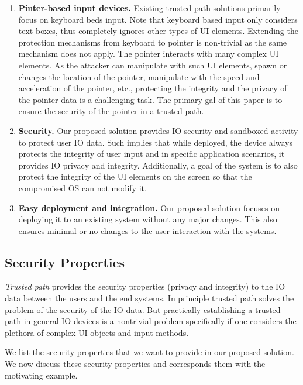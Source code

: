 \begin{enumerate}[leftmargin=*]
  \item  \textbf{Pinter-based input devices.} Existing trusted path solutions primarily focus on keyboard beds input. Note that keyboard based input only considers text boxes, thus completely ignores other types of UI elements. Extending the protection mechanisms from keyboard to pointer is non-trivial as the same mechanism does not apply. The pointer interacts with many complex UI elements. As the attacker can manipulate with such UI elements, spawn or changes the location of the pointer, manipulate with the speed and acceleration of the pointer, etc., protecting the integrity and the privacy of the pointer data is a challenging task. The primary gal of this paper is to ensure the security of the pointer in a trusted path.
  
   
   \item \textbf{Security.} Our proposed solution provides IO security and sandboxed activity to protect user IO data. Such implies that while deployed, the device always protects the integrity of user input and in specific application scenarios, it provides IO privacy and integrity. Additionally, a goal of the system is to also protect the integrity of the UI elements on the screen so that the compromised OS can not modify it.
   
  \item \textbf{Easy deployment and integration.} Our proposed solution focuses on deploying it to an existing system without any major changes. This also ensures minimal or no changes to the user interaction with the systems.

\end{enumerate}

\subsection{Security Properties}


\emph{Trusted path} provides the security properties (privacy and integrity) to the IO data between the users and the end systems. In principle trusted path solves the problem of the security of the IO data. But practically establishing a trusted path in general IO devices is a nontrivial problem specifically if one considers the plethora of complex UI objects and input methods.

We list the security properties that we want to provide in our proposed solution. We now discuss these security properties and corresponds them with the motivating example.

